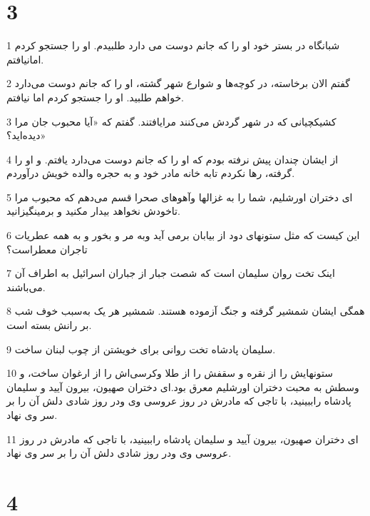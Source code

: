 \chapter{3}

\par 1 شبانگاه در بستر خود او را که جانم دوست می دارد طلبیدم. او را جستجو کردم امانیافتم.
\par 2 گفتم الان برخاسته، در کوچه‌ها و شوارع شهر گشته، او را که جانم دوست می‌دارد خواهم طلبید. او را جستجو کردم اما نیافتم.
\par 3 کشیکچیانی که در شهر گردش می‌کنند مرایافتند. گفتم که «آیا محبوب جان مرا دیده‌اید؟»
\par 4 از ایشان چندان پیش نرفته بودم که او را که جانم دوست می‌دارد یافتم. و او را گرفته، رها نکردم تابه خانه مادر خود و به حجره والده خویش درآوردم.
\par 5 ‌ای دختران اورشلیم، شما را به غزالها وآهوهای صحرا قسم می‌دهم که محبوب مرا تاخودش نخواهد بیدار مکنید و برمینگیزانید.
\par 6 این کیست که مثل ستونهای دود از بیابان برمی آید وبه مر و بخور و به همه عطریات تاجران معطراست؟
\par 7 اینک تخت روان سلیمان است که شصت جبار از جباران اسرائیل به اطراف آن می‌باشند.
\par 8 همگی ایشان شمشیر گرفته و جنگ آزموده هستند. شمشیر هر یک به‌سبب خوف شب بر رانش بسته است.
\par 9 سلیمان پادشاه تخت روانی برای خویشتن از چوب لبنان ساخت.
\par 10 ستونهایش را از نقره و سقفش را از طلا وکرسی‌اش را از ارغوان ساخت، و وسطش به محبت دختران اورشلیم معرق بود.‌ای دختران صهیون، بیرون آیید و سلیمان پادشاه راببینید، با تاجی که مادرش در روز عروسی وی ودر روز شادی دلش آن را بر سر وی نهاد.
\par 11 ‌ای دختران صهیون، بیرون آیید و سلیمان پادشاه راببینید، با تاجی که مادرش در روز عروسی وی ودر روز شادی دلش آن را بر سر وی نهاد.
 
\chapter{4}

